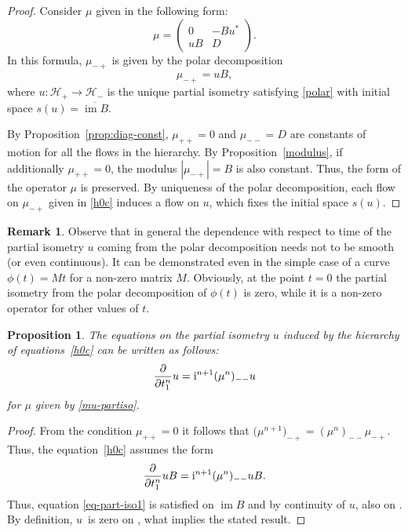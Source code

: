 \documentclass[pdftex]{sigma}
\newtheorem{prop}[thm]{Proposition}
\theoremstyle{definition}
\newtheorem{rem}[thm]{Remark}
\numberwithin{equation}{section}
\renewcommand{\H}{\mathcal{H}}
\DeclareMathOperator{\im}{im}
\newcommand{\abs}[1]{\left\vert#1\right\vert}
\renewcommand{\to}{\rightarrow}
\newcommand{\be}{\begin{equation}}
\newcommand{\ee}{\end{equation}}
\begin{document}
\begin{proof}

Consider $\mu$ given in the following form:
\be\label{mu-partiso}
\mu = \left(
\begin{matrix}
 0 & -Bu^*\\
 uB & D
\end{matrix}
\right).\ee
In this formula, $\mu_{-+}$ is given by the polar decomposition
\be\label{polar} \mu_{-+} = u B,\ee
where $u\colon\H_+\to\H_-$ is the unique partial isometry satisfying \eqref{polar} with initial space $s(u)=\overline{\im B}$.

By Proposition~\ref{prop:diag-const}, $\mu_{++}=0$ and $\mu_{--}=D$ are constants of motion for all the flows in the hierarchy. By Proposition~\ref{modulus}, if additionally $\mu_{++} = 0$, the modulus $\abs{\mu_{-+}} = B$ is also constant. Thus, the form of the operator $\mu$ is preserved. By uniqueness of the polar decomposition, each flow on $\mu_{-+}$ given in \eqref{h0c} induces a flow on $u$, which fixes the initial space $s(u)$.
\end{proof}

\begin{rem}
Observe that in general the dependence with respect to time of the partial isometry $u$ coming from the polar decomposition needs not to be smooth (or even continuous). It can be demonstrated even in the simple case of a curve $\phi(t)=M t$ for a non-zero matrix $M$. Obviously, at the point $t=0$ the partial isometry from the polar decomposition of $\phi(t)$ is zero, while it is a non-zero operator for other values of $t$.
\end{rem}

\begin{prop}\label{prop-part-iso1}
The equations on the partial isometry $u$ induced by the hierarchy of equations~\eqref{h0c} can be written as follows:
\be \label{eq-part-iso1}\frac\partial{\partial t^n_1} u = {\rm i}^{n+1} (\mu^{n})_{--} u\ee
for $\mu$ given by \eqref{mu-partiso}.
\end{prop}

\begin{proof}
From the condition $\mu_{++} = 0$ it follows that $\bigl(\mu^{n+1}\bigr)_{-+} = (\mu^n)_{--}\mu_{-+}$. Thus, the equation~\eqref{h0c} assumes the form
\[
\frac\partial{\partial t^n_1} uB = {\rm i}^{n+1} (\mu^{n})_{--} uB.
\]
Thus, equation \eqref{eq-part-iso1} is satisfied on $\im B$ and by continuity of $u$, also on \smash{$\overline{\im B}$}. By definition, $u$~is zero on \smash{$\overline{\im B}^\perp$}, what implies the stated result.
\end{proof}
\end{document}
